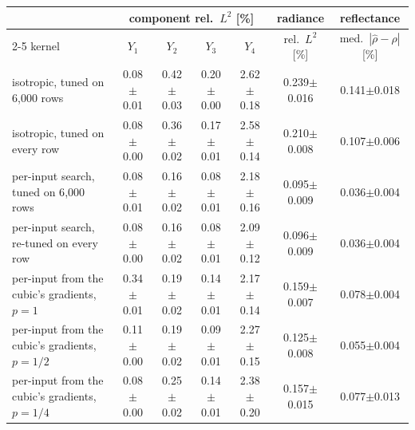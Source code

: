 \begin{tabular}{lcccccc}
\toprule
 & \multicolumn{4}{c}{component rel.\ $L^2$ [\%]} & radiance & reflectance \\
\cmidrule(lr){2-5}
kernel & $Y_1$ & $Y_2$ & $Y_3$ & $Y_4$ & rel.\ $L^2$ [\%] & med.\ $|\hat\rho-\rho|$ [\%] \\
\midrule
isotropic, tuned on 6{,}000 rows & 0.08$\pm$0.01 & 0.42$\pm$0.03 & 0.20$\pm$0.00 & 2.62$\pm$0.18 & 0.239$\pm$0.016 & 0.141$\pm$0.018 \\
isotropic, tuned on every row & 0.08$\pm$0.00 & 0.36$\pm$0.02 & 0.17$\pm$0.01 & 2.58$\pm$0.14 & 0.210$\pm$0.008 & 0.107$\pm$0.006 \\
per-input search, tuned on 6{,}000 rows & 0.08$\pm$0.01 & 0.16$\pm$0.02 & 0.08$\pm$0.01 & 2.18$\pm$0.16 & 0.095$\pm$0.009 & 0.036$\pm$0.004 \\
per-input search, re-tuned on every row & 0.08$\pm$0.00 & 0.16$\pm$0.02 & 0.08$\pm$0.01 & 2.09$\pm$0.12 & 0.096$\pm$0.009 & 0.036$\pm$0.004 \\
per-input from the cubic's gradients, $p=1$ & 0.34$\pm$0.01 & 0.19$\pm$0.02 & 0.14$\pm$0.01 & 2.17$\pm$0.14 & 0.159$\pm$0.007 & 0.078$\pm$0.004 \\
per-input from the cubic's gradients, $p=1/2$ & 0.11$\pm$0.00 & 0.19$\pm$0.02 & 0.09$\pm$0.01 & 2.27$\pm$0.15 & 0.125$\pm$0.008 & 0.055$\pm$0.004 \\
per-input from the cubic's gradients, $p=1/4$ & 0.08$\pm$0.00 & 0.25$\pm$0.02 & 0.14$\pm$0.01 & 2.38$\pm$0.20 & 0.157$\pm$0.015 & 0.077$\pm$0.013 \\
\bottomrule
\end{tabular}
